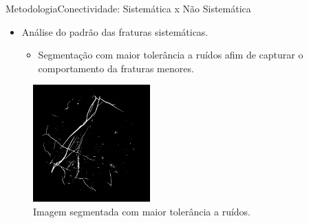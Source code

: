 \documentclass{beamer}
\begin{document}
\begin{frame}{Metodologia}{Conectividade: Sistemática x Não Sistemática}
\begin{itemize}
    \item Análise do padrão das fraturas sistemáticas.
       \begin{itemize}
           \item Segmentação com maior tolerância a ruídos afim de capturar o comportamento da fraturas menores.
       \end{itemize}
   
\end{itemize}    

\begin{figure}[!htb]
\centering
\includegraphics[width=4.5cm]{fig/seg_ruidos.png}\\
\scriptsize{Imagem segmentada com maior tolerância a ruídos.}
\end{figure}

\end{frame}    
\end{document}
